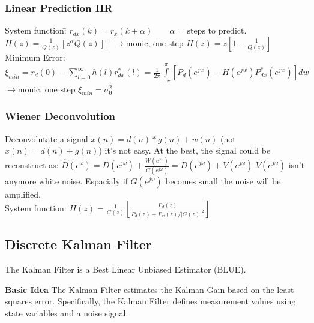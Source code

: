 \subsubsection{Linear Prediction IIR }
\begin{tabbing}
System function:\hspace{0.2cm}\=
	$ r_{dx}(k)=r_x(k+\alpha)  \qquad \alpha \text{ = steps to predict.} $\\
\>	$ H(z)= \frac{1}{Q(z)}[z^\alpha Q(z)]_+ $ \hspace{6.8cm} \=$\rightarrow \text{monic, one step } H(z) = z [1- \frac{1}{Q(z)}] $\\
Minimum Error:\>
	$\xi_{min} =r_d(0)-\sum \limits_{l=0}^\infty h(l)r_{dx}^{*}(l)
		=\frac{1}{2\pi}\int \limits_{-\pi}^\pi[P_d(e^{jw})-H(e^{jw})P_{dx}^{*}(e^{jw})]dw $\>$ \rightarrow \text{monic, one step } \xi_{min} = \sigma^2_0$\\
\end{tabbing}


\subsubsection{Wiener Deconvolution }
Deconvolutate a signal $x(n)=d(n)\ast g(n) + w(n)$ (not $x(n)=d(n) + g(n)$) it's not easy. At the best, the signal could be reconstruct as:
$\hat{D}(e^{\omega})=D(e^{j\omega}) + \frac{W(e^{j\omega})}{G(e^{j\omega})}=D(e^{j\omega})+V(e^{j\omega})$ \quad $V(e^{j\omega})$ isn't anymore white noise. 
Espacialy if $G(e^{j\omega})$ becomes small the noise will be amplified.\\
System function:\hspace{1.2cm}
	$ H(z)= \frac{1}{G(z)}\left[\frac{P_d(z)}{P_d(z)+P_w(z)/|G(z)|^2}\right]$\\


\subsection{Discrete Kalman Filter}
The Kalman Filter is a Best Linear Unbiased Estimator (BLUE).

\textbf{Basic Idea} The Kalman Filter estimates the Kalman Gain based on
the least squares error. Specifically, the Kalman Filter defines measurement values
using state variables and a noise signal. \\

